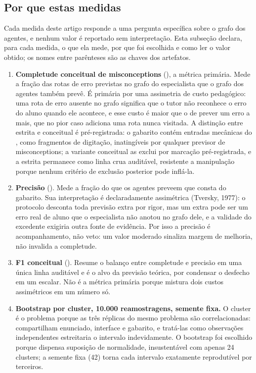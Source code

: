 \documentclass[11pt,a4paper]{article}
\begin{document}
\subsection{Por que estas medidas}
\label{sec:desfechos}

Cada medida deste artigo responde a uma pergunta específica sobre o grafo dos agentes, e nenhum valor é reportado sem interpretação. Esta subseção declara, para cada medida, o que ela mede, por que foi escolhida e como ler o valor obtido; os nomes entre parênteses são as chaves dos artefatos.

\begin{enumerate}
  \item \textbf{Completude conceitual de misconceptions} (), a métrica primária. Mede a fração das rotas de erro previstas no grafo do especialista que o grafo dos agentes também prevê. É primária por uma assimetria de custo pedagógico: uma rota de erro ausente no grafo significa que o tutor não reconhece o erro do aluno quando ele acontece, e esse custo é maior que o de prever um erro a mais, que no pior caso adiciona uma rota nunca visitada. A distinção entre estrita e conceitual é pré-registrada: o gabarito contém entradas mecânicas do , como fragmentos de digitação, inatingíveis por qualquer previsor de misconceptions; a variante conceitual as exclui por marcação pré-registrada, e a estrita permanece como linha crua auditável, resistente a manipulação porque nenhum critério de exclusão posterior pode inflá-la.
  \item \textbf{Precisão} (). Mede a fração do que os agentes preveem que consta do gabarito. Sua interpretação é declaradamente assimétrica (Tversky, 1977): o protocolo desconta toda previsão extra por rigor, mas um extra pode ser um erro real de aluno que o especialista não anotou no grafo dele, e a validade do excedente exigiria outra fonte de evidência. Por isso a precisão é acompanhamento, não veto: um valor moderado sinaliza margem de melhoria, não invalida a completude.
  \item \textbf{F1 conceitual} (). Resume o balanço entre completude e precisão em uma única linha auditável e é o alvo da previsão teórica, por condensar o desfecho em um escalar. Não é a métrica primária porque mistura dois custos assimétricos em um número só.
  \item \textbf{Bootstrap por cluster, 10.000 reamostragens, semente fixa.} O cluster é o problema porque as três réplicas do mesmo problema são correlacionadas: compartilham enunciado, interface e gabarito, e tratá-las como observações independentes estreitaria o intervalo indevidamente. O bootstrap foi escolhido porque dispensa suposição de normalidade, insustentável com apenas 24 clusters; a semente fixa (42) torna cada intervalo exatamente reprodutível por terceiros.

\end{enumerate}
\end{document}
